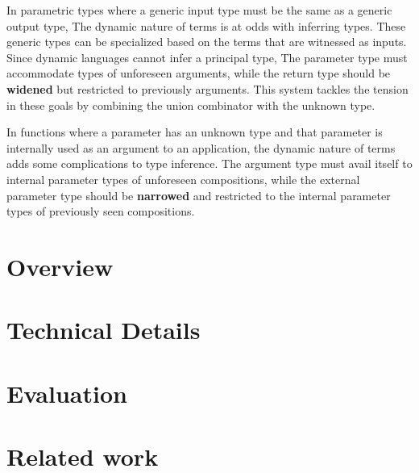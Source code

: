\documentclass[sigplan,screen]{acmart}
\begin{document}
In parametric types where a generic input type must be the same as a generic output type,
The dynamic nature of terms is at odds with inferring types.
These generic types can be specialized based on the terms that are witnessed as inputs. 
Since dynamic languages cannot infer a principal type, 
The parameter type must accommodate types of unforeseen arguments, 
while the return type should be \textbf{widened} but restricted to previously arguments.
This system tackles the tension in these goals by combining the union combinator  
with the unknown type. 

In functions where a parameter has an unknown type and that parameter is 
internally used as an argument to an application, the dynamic nature of terms  
adds some complications to type inference.
The argument type must avail itself to internal parameter types of unforeseen compositions,
while the external parameter type should be \textbf{narrowed} and restricted 
to the internal parameter types of previously seen compositions.




\section{Overview}

\section{Technical Details}

\section{Evaluation}

\section{Related work}





\end{document}
